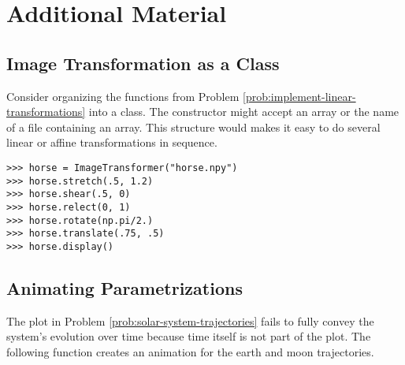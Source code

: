 \newpage

\section*{Additional Material} %

\subsection*{Image Transformation as a Class} %

Consider organizing the functions from Problem \ref{prob:implement-linear-transformations} into a class.
The constructor might accept an array or the name of a file containing an array.
This structure would makes it easy to do several linear or affine transformations in sequence.

\begin{lstlisting}
>>> horse = ImageTransformer("horse.npy")
>>> horse.stretch(.5, 1.2)
>>> horse.shear(.5, 0)
>>> horse.relect(0, 1)
>>> horse.rotate(np.pi/2.)
>>> horse.translate(.75, .5)
>>> horse.display()
\end{lstlisting}

\subsection*{Animating Parametrizations} %

The plot in Problem \ref{prob:solar-system-trajectories} fails to fully convey the system's evolution over time because time itself is not part of the plot.
The following function creates an animation for the earth and moon trajectories.


